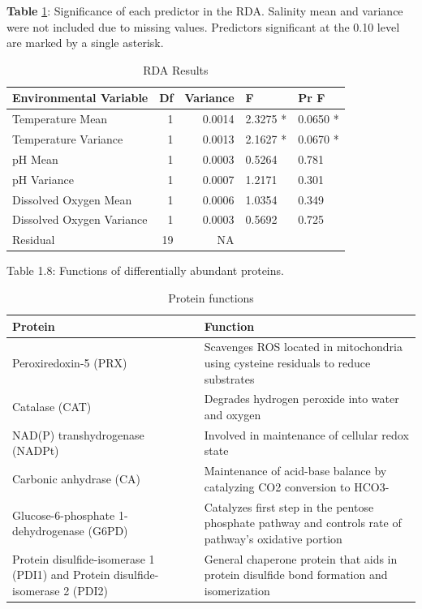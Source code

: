 \documentclass [11pt, proquest] {uwthesis}[2015/03/03]
\begin{document}
\textbf{Table} \ref{tab:RDA}: Significance of each predictor in the RDA. Salinity mean and variance were not included due to missing values. Predictors significant at the 0.10 level are marked by a single asterisk.

\begingroup\fontsize{8}{10}\selectfont
\begin{longtable}[t]{lrrll}
\caption{\label{tab:RDA}RDA Results}\\
\toprule
Environmental Variable & Df & Variance & F & Pr  F \\
\midrule
Temperature Mean & 1 & 0.0014 & 2.3275 * & 0.0650 *\\
Temperature Variance & 1 & 0.0013 & 2.1627 * & 0.0670 *\\
pH Mean & 1 & 0.0003 & 0.5264 & 0.781\\
pH Variance & 1 & 0.0007 & 1.2171 & 0.301\\
Dissolved Oxygen Mean & 1 & 0.0006 & 1.0354 & 0.349\\
\addlinespace
Dissolved Oxygen Variance & 1 & 0.0003 & 0.5692 & 0.725\\
Residual & 19 & NA &  & \\
\bottomrule
\end{longtable}
\endgroup{}
\clearpage
\begin{landscape}

Table 1.8: Functions of differentially abundant proteins.

\begingroup\fontsize{8}{10}\selectfont
\begin{longtable}[t]{ll}
\caption{\label{tab:protfunctions}Protein functions}\\
\toprule
Protein & Function\\
\midrule
Peroxiredoxin-5 (PRX) & Scavenges ROS located in mitochondria using cysteine residuals to reduce substrates\\
Catalase (CAT) & Degrades hydrogen peroxide into water and oxygen\\
NAD(P) transhydrogenase (NADPt) & Involved in maintenance of cellular redox state\\
Carbonic anhydrase (CA) & Maintenance of acid-base balance by catalyzing CO2 conversion to HCO3- \\
Glucose-6-phosphate 1-dehydrogenase (G6PD) & Catalyzes first step in the pentose phosphate pathway and controls rate of pathway’s oxidative portion\\
\addlinespace
Protein disulfide-isomerase 1 (PDI1) and Protein disulfide-isomerase 2 (PDI2) & General chaperone protein that aids in protein disulfide bond formation and isomerization\\
\bottomrule
\end{longtable}
\endgroup{}
\end{landscape}
\clearpage
\end{document}
